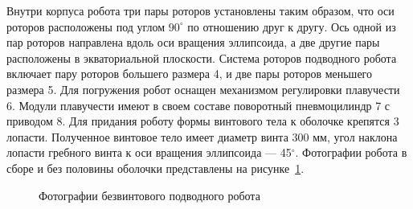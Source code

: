 Внутри корпуса робота три пары роторов установлены таким образом, что оси роторов расположены под углом $90^\circ$ по отношению друг к другу. Ось одной из пар роторов направлена вдоль оси вращения эллипсоида, а две другие пары расположены в экваториальной плоскости. 
Система роторов подводного робота включает пару роторов большего размера 4, и две пары роторов меньшего размера 5. %
Для погружения робот оснащен механизмом регулировки плавучести 6. Модули плавучести имеют в своем составе поворотный пневмоцилиндр 7 с приводом 8. %
Для придания роботу формы винтового тела к оболочке крепятся 3 лопасти. Полученное винтовое тело имеет диаметр винта 300 мм, угол наклона лопасти гребного винта к оси вращения эллипсоида --- 45$^{\circ}$. Фотографии робота в сборе и без половины оболочки представлены на рисунке~\ref{Photo_BPR}. 

\begin{figure}[h]
	\begin{minipage}[h]{0.5\linewidth}
	\end{minipage}
	\hfill
	\begin{minipage}[h]{0.5\linewidth}
	\end{minipage}	
	\caption{Фотографии безвинтового подводного робота}
	\label{Photo_BPR}
\end{figure}

